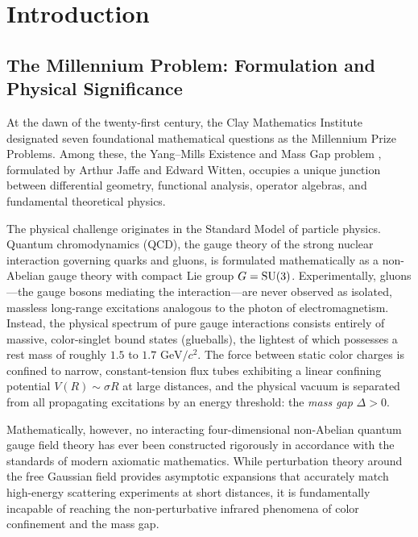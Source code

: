\chapter{Introduction}
\label{ch:intro}

\section{The Millennium Problem: Formulation and Physical Significance}
\label{sec:problem}

At the dawn of the twenty-first century, the Clay Mathematics Institute designated seven foundational mathematical questions as the Millennium Prize Problems. Among these, the Yang--Mills Existence and Mass Gap problem \cite{JaffeWitten2000}, formulated by Arthur Jaffe and Edward Witten, occupies a unique junction between differential geometry, functional analysis, operator algebras, and fundamental theoretical physics. 

The physical challenge originates in the Standard Model of particle physics. Quantum chromodynamics (QCD), the gauge theory of the strong nuclear interaction governing quarks and gluons, is formulated mathematically as a non-Abelian gauge theory with compact Lie group $G = \mathrm{SU}(3)$. Experimentally, gluons---the gauge bosons mediating the interaction---are never observed as isolated, massless long-range excitations analogous to the photon of electromagnetism. Instead, the physical spectrum of pure gauge interactions consists entirely of massive, color-singlet bound states (glueballs), the lightest of which possesses a rest mass of roughly $1.5$ to $1.7\text{ GeV}/c^2$. The force between static color charges is confined to narrow, constant-tension flux tubes exhibiting a linear confining potential $V(R) \sim \sigma R$ at large distances, and the physical vacuum is separated from all propagating excitations by an energy threshold: the \emph{mass gap} $\Delta > 0$.

Mathematically, however, no interacting four-dimensional non-Abelian quantum gauge field theory has ever been constructed rigorously in accordance with the standards of modern axiomatic mathematics. While perturbation theory around the free Gaussian field provides asymptotic expansions that accurately match high-energy scattering experiments at short distances, it is fundamentally incapable of reaching the non-perturbative infrared phenomena of color confinement and the mass gap. 

